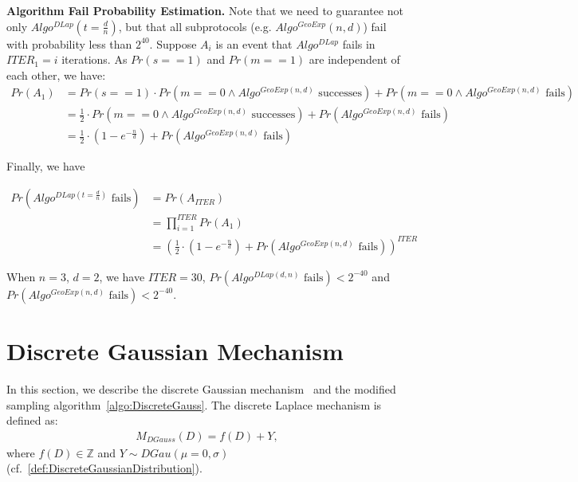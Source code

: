 \textbf{Algorithm Fail Probability Estimation.}
Note that we need to guarantee not only $Algo^{DLap}\left(t=\frac{d}{n}\right) $, but that all subprotocols (e.g. $Algo^{GeoExp}\left(n,d\right)$) fail with probability less than $2^{40}$.
Suppose $A_i$ is an event that $Algo^{DLap}$ fails in $ITER_1=i$ iterations.
As $Pr\left(s==1\right)$ and  $Pr\left(m==1\right)$ are independent of each other, we have:
\begin{equation}
    \begin{split}
        Pr\left(A_1\right) &=        Pr\left(s==1\right) \cdot Pr\left(m==0 \land Algo^{GeoExp\left(n,d\right) } \text{ successes}  \right)+Pr\left(m==0 \land Algo^{GeoExp\left(n,d\right) } \text{ fails}  \right)\\
        &=  \frac{1}{2}\cdot Pr\left(m==0 \land Algo^{GeoExp\left(n,d\right) } \text{ successes}  \right)+Pr\left( Algo^{GeoExp\left(n,d\right) } \text{ fails}  \right)\\
        &=\frac{1}{2}\cdot\left(1-e^{-\frac{n}{d}}\right) + Pr\left( Algo^{GeoExp\left(n,d\right) } \text{ fails} \right)
    \end{split}
\end{equation}

Finally, we have

\begin{equation}
    \begin{split}
        Pr\left( Algo^{DLap\left(t=\frac{d}{n}\right) } \text{ fails} \right) &=  Pr\left(A_{ITER}\right) \\
        &=\prod _{i=1}^{ITER}Pr\left(A_1\right)\\
        &= \left(\frac{1}{2} \cdot \left(1-e^{-\frac{n}{d}}\right) + Pr\left( Algo^{GeoExp\left(n,d\right) } \text{ fails} \right)\right)^{ITER}
    \end{split}
\end{equation}

When $n=3$, $d=2$, we have $ITER=30$, $Pr\left( Algo^{DLap\left(d,n\right) } \text{ fails} \right) <2^{-40}$ and~$Pr\left( Algo^{GeoExp\left(n,d\right) } \text{ fails} \right)  <2^{-40}$.

\section{Discrete Gaussian Mechanism}
\label{sec:DiscreteGaussianMechanism}
In this section, we describe the discrete Gaussian mechanism~\cite{canonne2020discrete} and the modified sampling algorithm~\autoref{algo:DiscreteGauss}.
The discrete Laplace mechanism is defined as:
\begin{equation}
    \begin{split}
        M_{DGauss}\left(D\right)=f\left(D\right)+Y,
    \end{split}
\end{equation}
where $f\left(D\right)\in \mathbb{Z} $ and $Y\sim DGau \left(\mu=0,\sigma\right)$ (cf.~\autoref{def:DiscreteGaussianDistribution}).

